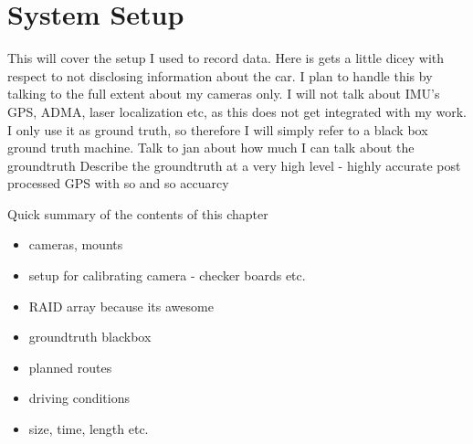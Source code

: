 \chapter{System Setup}
\label{chapter:system_setup}

This will cover the setup I used to record data.  Here is gets a little dicey with respect to not
disclosing information about the car.  I plan to handle this by talking to the full extent about my
cameras only.  I will not talk about IMU's GPS, ADMA, laser localization etc, as this does not get
integrated with my work. I only use it as ground truth, so therefore I will simply refer to a black
box ground truth machine.
\newline
Talk to jan about how much I can talk about the groundtruth
\newline
Describe the groundtruth at a very high level - highly accurate post processed GPS with so and so
accuarcy

Quick summary of the contents of this chapter

\begin{itemize}
 \item cameras, mounts
 \item setup for calibrating camera - checker boards etc.
 \item RAID array because its awesome
 \item groundtruth blackbox
 \item planned routes
 \item driving conditions
 \item size, time, length etc.
\end{itemize}



